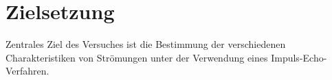 \section{Zielsetzung}
Zentrales Ziel des Versuches ist die Bestimmung der verschiedenen Charakteristiken von Strömungen unter der Verwendung eines 
Impuls-Echo-Verfahren.
